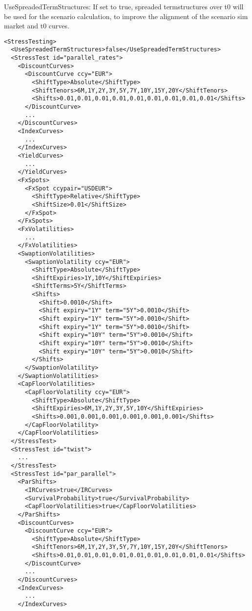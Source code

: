 UseSpreadedTermStructures: If set to true, spreaded termstructures over t0 will be used for the scenario calculation, to
improve the alignment of the scenario sim market and t0 curves.

\begin{longlisting}
  \begin{verbatim}
<StressTesting>
  <UseSpreadedTermStructures>false</UseSpreadedTermStructures>
  <StressTest id="parallel_rates">
    <DiscountCurves>
      <DiscountCurve ccy="EUR">
        <ShiftType>Absolute</ShiftType>
        <ShiftTenors>6M,1Y,2Y,3Y,5Y,7Y,10Y,15Y,20Y</ShiftTenors>
        <Shifts>0.01,0.01,0.01,0.01,0.01,0.01,0.01,0.01,0.01</Shifts>
      </DiscountCurve>
      ...
    </DiscountCurves>
    <IndexCurves>
      ...
    </IndexCurves>
    <YieldCurves>
      ...
    </YieldCurves>
    <FxSpots>
      <FxSpot ccypair="USDEUR">
        <ShiftType>Relative</ShiftType>
        <ShiftSize>0.01</ShiftSize>
      </FxSpot>
    </FxSpots>
    <FxVolatilities>
      ...
    </FxVolatilities>
    <SwaptionVolatilities>
      <SwaptionVolatility ccy="EUR">
        <ShiftType>Absolute</ShiftType>
        <ShiftExpiries>1Y,10Y</ShiftExpiries>
        <ShiftTerms>5Y</ShiftTerms>
        <Shifts>
          <Shift>0.0010</Shift>
          <Shift expiry="1Y" term="5Y">0.0010</Shift>
          <Shift expiry="1Y" term="5Y">0.0010</Shift>
          <Shift expiry="1Y" term="5Y">0.0010</Shift>
          <Shift expiry="10Y" term="5Y">0.0010</Shift>
          <Shift expiry="10Y" term="5Y">0.0010</Shift>
          <Shift expiry="10Y" term="5Y">0.0010</Shift>
        </Shifts>
      </SwaptionVolatility>
    </SwaptionVolatilities>
    <CapFloorVolatilities>
      <CapFloorVolatility ccy="EUR">
        <ShiftType>Absolute</ShiftType>
        <ShiftExpiries>6M,1Y,2Y,3Y,5Y,10Y</ShiftExpiries>
        <Shifts>0.001,0.001,0.001,0.001,0.001,0.001</Shifts>
      </CapFloorVolatility>
    </CapFloorVolatilities>
  </StressTest>
  <StressTest id="twist">
    ...
  </StressTest>
  <StressTest id="par_parallel">
    <ParShifts>
      <IRCurves>true</IRCurves>
      <SurvivalProbability>true</SurvivalProbability>
      <CapFloorVolatilities>true</CapFloorVolatilities>
    </ParShifts>
    <DiscountCurves>
      <DiscountCurve ccy="EUR">
        <ShiftType>Absolute</ShiftType>
        <ShiftTenors>6M,1Y,2Y,3Y,5Y,7Y,10Y,15Y,20Y</ShiftTenors>
        <Shifts>0.01,0.01,0.01,0.01,0.01,0.01,0.01,0.01,0.01</Shifts>
      </DiscountCurve>
      ...
    </DiscountCurves>
    <IndexCurves>
      ...
    </IndexCurves>

\end{verbatim}
\end{longlisting}
